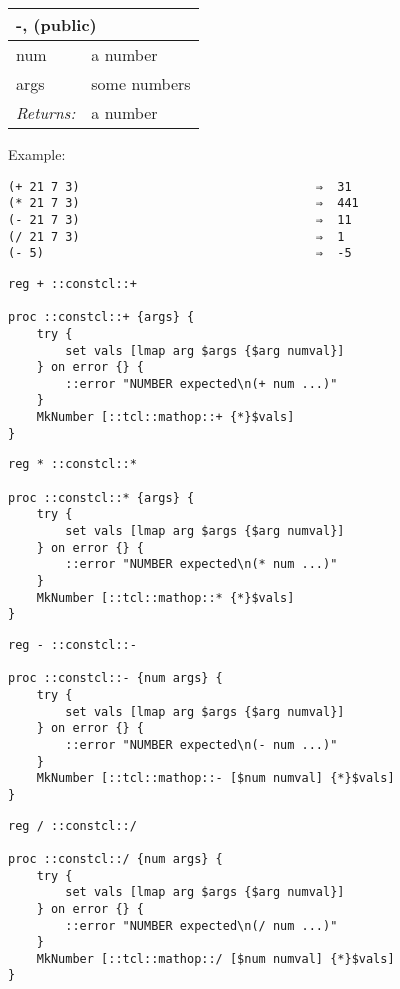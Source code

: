 \documentclass{report}
\begin{document}
\begin{tabular}{ |l l| }
\hline
\multicolumn{2}{|l|}{-,  (public)} \\
\hline
num & a number \\
args & some numbers \\
\textit{Returns:} & a number \\
\hline
\end{tabular}


Example:

\noindent\makebox[\linewidth]{\rule{\linewidth}{0.4pt}}
\begin{lstlisting}
(+ 21 7 3)                                 ⇒  31
(* 21 7 3)                                 ⇒  441
(- 21 7 3)                                 ⇒  11
(/ 21 7 3)                                 ⇒  1
(- 5)                                      ⇒  -5
\end{lstlisting}
\noindent\makebox[\linewidth]{\rule{\linewidth}{0.4pt}}
\noindent\makebox[\linewidth]{\rule{\linewidth}{0.4pt}}
\begin{lstlisting}
reg + ::constcl::+
 
proc ::constcl::+ {args} {
    try {
        set vals [lmap arg $args {$arg numval}]
    } on error {} {
        ::error "NUMBER expected\n(+ num ...)"
    }
    MkNumber [::tcl::mathop::+ {*}$vals]
}
\end{lstlisting}
\noindent\makebox[\linewidth]{\rule{\linewidth}{0.4pt}}
\noindent\makebox[\linewidth]{\rule{\linewidth}{0.4pt}}
\begin{lstlisting}
reg * ::constcl::*
 
proc ::constcl::* {args} {
    try {
        set vals [lmap arg $args {$arg numval}]
    } on error {} {
        ::error "NUMBER expected\n(* num ...)"
    }
    MkNumber [::tcl::mathop::* {*}$vals]
}
\end{lstlisting}
\noindent\makebox[\linewidth]{\rule{\linewidth}{0.4pt}}
\noindent\makebox[\linewidth]{\rule{\linewidth}{0.4pt}}
\begin{lstlisting}
reg - ::constcl::-
 
proc ::constcl::- {num args} {
    try {
        set vals [lmap arg $args {$arg numval}]
    } on error {} {
        ::error "NUMBER expected\n(- num ...)"
    }
    MkNumber [::tcl::mathop::- [$num numval] {*}$vals]
}
\end{lstlisting}
\noindent\makebox[\linewidth]{\rule{\linewidth}{0.4pt}}
\noindent\makebox[\linewidth]{\rule{\linewidth}{0.4pt}}
\begin{lstlisting}
reg / ::constcl::/
 
proc ::constcl::/ {num args} {
    try {
        set vals [lmap arg $args {$arg numval}]
    } on error {} {
        ::error "NUMBER expected\n(/ num ...)"
    }
    MkNumber [::tcl::mathop::/ [$num numval] {*}$vals]
}
\end{lstlisting}
\noindent\makebox[\linewidth]{\rule{\linewidth}{0.4pt}}
\end{document}

